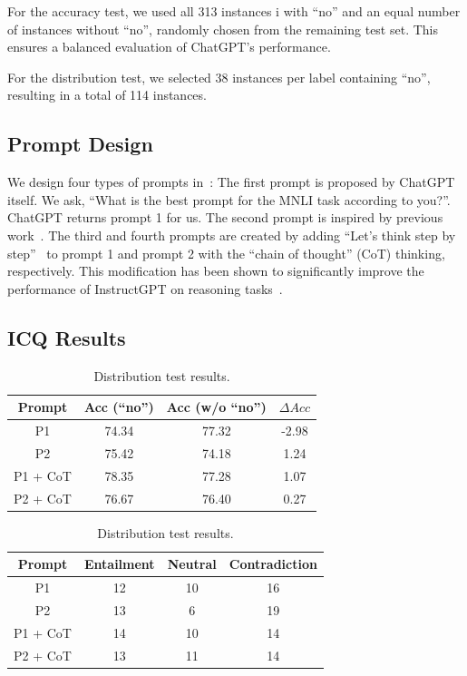 For the accuracy test, we used all 313 instances i
with ``no'' and an equal number of instances without 
``no'', randomly chosen from the remaining test set. 
This ensures a balanced evaluation of ChatGPT's performance.

For the distribution test, we selected 38 
instances per label containing ``no'', 
resulting in a total of 114 instances. 

\subsection{Prompt Design}
We design four types of prompts in~:
The first prompt is proposed by ChatGPT itself. 
We ask, ``What is the best prompt for the MNLI task according to you?''. 
ChatGPT returns prompt 1 for us. 
The second prompt is inspired by previous work~\cite{qin2023chatgpt}.
The third and fourth prompts are created by adding ``Let's think step by step''~\cite{kojima2022large}
to prompt 1 and prompt 2 with the ``chain of thought'' (CoT) thinking, respectively. 
This modification has been shown to significantly improve 
the performance of InstructGPT on reasoning tasks~\cite{ouyang2022training}.

\subsection{ICQ Results}
\label{sec:chatgptacc}
\begin{table}[th]
\centering
\begin{minipage}{0.45\linewidth}
\centering
\scriptsize
\begin{tabular}{c|ccc}
\toprule
\textbf{Prompt} & Acc (``no'') & Acc (w/o ``no'') & $\Delta Acc$ \\ \midrule
P1  & 74.34& 77.32& -2.98   \\ \hline
P2&  75.42& 74.18 & 1.24 \\ \hline
P1 + CoT  & 78.35& 77.28&1.07  \\ \hline
P2 + CoT&  76.67& 76.40&  0.27 \\ \hline
 \bottomrule
\end{tabular}
\caption{Accuracy test results (\%). P1=Prompt 1, P2=Prompt 2.}
\label{tab:accuracy}
\end{minipage}\hfill
\begin{minipage}{0.45\linewidth}
\centering
\scriptsize
\begin{tabular}{c|ccc}
\toprule
\textbf{Prompt} & Entailment & Neutral & Contradiction \\ \midrule
P1&  12&    10&  16\\ \hline
P2 &  13 &    6&  19 \\ \hline
P1 + CoT  & 14& 10&  14 \\ \hline
P2 + CoT & 13& 11&  14\\ \hline
 \bottomrule
\end{tabular}
\caption{Distribution test results.}
\label{tab:distribution}
\end{minipage}
\end{table}

